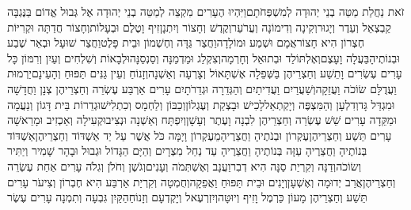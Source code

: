 \documentclass[../main/main.tex]{subfiles}
\begin{document}
\begin{multicols*}{\ncols}
זֹאת נַחֲלַת מַטֵּה בְנֵי יְהוּדָה לְמִשְׁפְּחֹתָם\PreVerseSpace{}וַיִּהְיוּ הֶעָרִים מִקְצֵה לְמַטֵּה בְנֵי יְהוּדָה אֶל גְּבוּל אֱדוֹם בַּנֶּגְבָּה קַבְצְאֵל וְעֵדֶר וְיָגוּר\PreVerseSpace{}וְקִינָה וְדִימוֹנָה וְעֲרֹעֵר\SubEnd{}\PreVerseSpace{}וְקֶדֶשׁ וְחָצוֹר וְיִתְנָן\PreVerseSpace{}זִיף וָטֶלֶם וּבְעָלוֹת\PreVerseSpace{}וְחָצוֹר חֲדַתָּה וּקְרִיּוֹת חֶצְרוֹן הִיא חָצוֹר\PreVerseSpace{}אֲמָם וּשְׁמַע וּמוֹלָדָה\PreVerseSpace{}וַחֲצַר גַּדָּה וְחֶשְׁמוֹן וּבֵית פָּלֶט\PreVerseSpace{}וַחֲצַר שׁוּעָל וּבְאֵר שֶׁבַע וּבְנוֹתֶיהָ\SubEnd{}\PreVerseSpace{}בַּעֲלָה  וָעָצֶם\PreVerseSpace{}וְאֶלְתּוֹלַד וּבְתוּאֵל\SubEnd{} וְחָרְמָה\PreVerseSpace{}וְצִקְלַג וּמַדְמַנָּה וְסַנְסַנָּה\PreVerseSpace{}וּלְבָאוֹת וְשִׁלְחִים וְעַיִן וְרִמּוֹן כָּל עָרִים עֶשְׂרִים וָתֵשַׁע וְחַצְרֵיהֶן \ClosedSection{}בַּשְּׁפֵלָה אֶשְׁתָּאוֹל וְצָרְעָה וְאַשְׁנָה\PreVerseSpace{}וְזָנוֹחַ וְעֵין גַּנִּים תַּפּוּחַ וְהָעֵינָם\PreVerseSpace{}יַרְמוּת וַעֲדֻלָּם שׂוֹכֹה וַעֲזֵקָה\PreVerseSpace{}וְשַׁעֲרַיִם וַעֲדִיתַיִם וְהַגְּדֵרָה וּגְדֵרֹתָיִם עָרִים אַרְבַּע עֶשְׂרֵה וְחַצְרֵיהֶן \ClosedSection{}צְנָן וַחֲדָשָׁה וּמִגְדַּל גָּד\PreVerseSpace{}וְדִלְעָן וְהַמִּצְפֶּה וְיָקְתְאֵל\PreVerseSpace{}לָכִישׁ וּבָצְקַת וְעֶגְלוֹן\PreVerseSpace{}וְכַבּוֹן וְלַחְמָס וְכִתְלִישׁ\PreVerseSpace{}וּגְדֵרוֹת בֵּית דָּגוֹן וְנַעֲמָה וּמַקֵּדָה עָרִים שֵׁשׁ עֶשְׂרֵה וְחַצְרֵיהֶן \ClosedSection{}לִבְנָה וָעֶתֶר וְעָשָׁן\PreVerseSpace{}וְיִפְתָּח וְאַשְׁנָה וּנְצִיב\PreVerseSpace{}וּקְעִילָה וְאַכְזִיב וּמָרֵאשָׁה עָרִים תֵּשַׁע וְחַצְרֵיהֶן\PreVerseSpace{}עֶקְרוֹן וּבְנֹתֶיהָ וַחֲצֵרֶיהָ\PreVerseSpace{}מֵעֶקְרוֹן וָיָמָּה כֹּל אֲשֶׁר עַל יַד אַשְׁדּוֹד וְחַצְרֵיהֶן\PreVerseSpace{}אַשְׁדּוֹד בְּנוֹתֶיהָ וַחֲצֵרֶיהָ עַזָּה בְּנוֹתֶיהָ וַחֲצֵרֶיהָ עַד נַחַל מִצְרָיִם וְהַיָּם הַגָּדוֹל\SubEnd{} וּגְבוּל \ClosedSection{}וּבָהָר שָׁמִיר וְיַתִּיר וְשׂוֹכֹה\PreVerseSpace{}וְדַנָּה וְקִרְיַת סַנָּה הִיא דְבִר\PreVerseSpace{}וַעֲנָב וְאֶשְׁתְּמֹה וְעָנִים\PreVerseSpace{}וְגֹשֶׁן וְחֹלֹן וְגִלֹה עָרִים אַחַת עֶשְׂרֵה וְחַצְרֵיהֶן\PreVerseSpace{}אֲרַב יְדוּמָה\SubEnd{} וְאֶשְׁעָן\PreVerseSpace{}וְיָנִים וּבֵית תַּפּוּחַ וַאֲפֵקָה\PreVerseSpace{}וְחֻמְטָה וְקִרְיַת אַרְבַּע הִיא חֶבְרוֹן וְצִיעֹר עָרִים תֵּשַׁע וְחַצְרֵיהֶן \ClosedSection{}מָעוֹן כַּרְמֶל וָזִיף וְיוּטָּה\PreVerseSpace{}וְיִזְרְעֶאל וְיָקְדְעָם וְזָנוֹחַ\PreVerseSpace{}הַקַּיִן גִּבְעָה וְתִמְנָה עָרִים עֶשֶׂר 
\end{multicols*}
\end{document}

